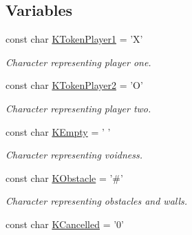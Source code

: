 \subsection*{Variables}
\begin{DoxyCompactItemize}
\item 
\hypertarget{namespace_chase_game_a8452e2d6de618e4ca7a9f76b082b52a4}{const char \hyperlink{namespace_chase_game_a8452e2d6de618e4ca7a9f76b082b52a4}{K\-Token\-Player1} = 'X'}\label{namespace_chase_game_a8452e2d6de618e4ca7a9f76b082b52a4}

\begin{DoxyCompactList}\small\item\em Character representing player one. \end{DoxyCompactList}\item 
\hypertarget{namespace_chase_game_ae27343407c21a8d6e3cf26b736bd5527}{const char \hyperlink{namespace_chase_game_ae27343407c21a8d6e3cf26b736bd5527}{K\-Token\-Player2} = 'O'}\label{namespace_chase_game_ae27343407c21a8d6e3cf26b736bd5527}

\begin{DoxyCompactList}\small\item\em Character representing player two. \end{DoxyCompactList}\item 
\hypertarget{namespace_chase_game_aa036d4de40188ba2e1aa36ab6cfaf1da}{const char \hyperlink{namespace_chase_game_aa036d4de40188ba2e1aa36ab6cfaf1da}{K\-Empty} = ' '}\label{namespace_chase_game_aa036d4de40188ba2e1aa36ab6cfaf1da}

\begin{DoxyCompactList}\small\item\em Character representing voidness. \end{DoxyCompactList}\item 
\hypertarget{namespace_chase_game_ad86181b2050b912dab9d69d2f0bea76e}{const char \hyperlink{namespace_chase_game_ad86181b2050b912dab9d69d2f0bea76e}{K\-Obstacle} = '\#'}\label{namespace_chase_game_ad86181b2050b912dab9d69d2f0bea76e}

\begin{DoxyCompactList}\small\item\em Character representing obstacles and walls. \end{DoxyCompactList}\item 
\hypertarget{namespace_chase_game_a12d6411bb9a72150acba6060bb1587e1}{const char \hyperlink{namespace_chase_game_a12d6411bb9a72150acba6060bb1587e1}{K\-Cancelled} = '0'}\label{namespace_chase_game_a12d6411bb9a72150acba6060bb1587e1}


\end{DoxyCompactItemize}
